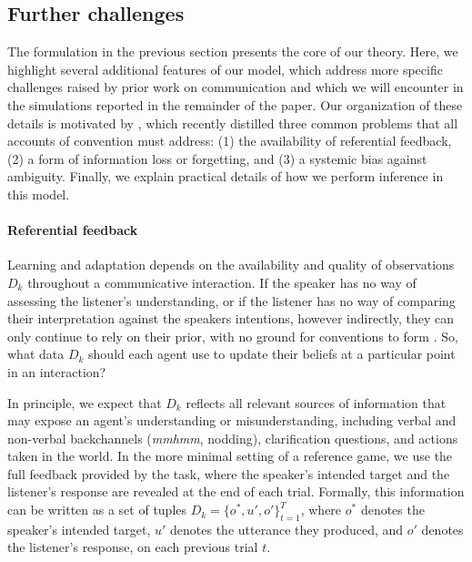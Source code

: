\subsection{Further challenges}

The formulation in the previous section presents the core of our theory.
Here, we highlight several additional features of our model, which address more specific challenges raised by prior work on communication and which we will encounter in the simulations reported in the remainder of the paper. 
Our organization of these details is motivated by , which recently distilled three common problems that all accounts of convention must address: (1) the availability of referential feedback, (2) a form of information loss or forgetting, and (3) a systemic bias against ambiguity.
Finally, we explain practical details of how we perform inference in this model. 

\paragraph{Referential feedback}

Learning and adaptation depends on the availability and quality of observations $D_k$ throughout a communicative interaction.
If the speaker has no way of assessing the listener's understanding, or if the listener has no way of comparing their interpretation against the speakers intentions, however indirectly, they can only continue to rely on their prior, with no ground for conventions to form  \cite{KraussWeinheimer66_Tangrams,HupetChantraine92_CollaborationOrRepitition,GarrodFayLeeOberlanderMacLeod07_GraphicalSymbolSystems}.
So, what data $D_k$ should each agent use to update their beliefs at a particular point in an interaction?

In principle, we expect that $D_k$ reflects all relevant sources of information that may expose an agent's understanding or misunderstanding, including verbal and non-verbal backchannels (\emph{mmhmm}, nodding), clarification questions, and actions taken in the world.
In the more minimal setting of a reference game, we use the full feedback provided by the task, where the speaker's intended target and the listener's response are revealed at the end of each trial. 
Formally, this information can be written as a set of tuples $D_k = \{o^*, u', o'\}_{t=1}^T$, where $o^*$ denotes the speaker's intended target, $u'$ denotes the utterance they produced, and $o'$ denotes the listener's response, on each previous trial $t$.

